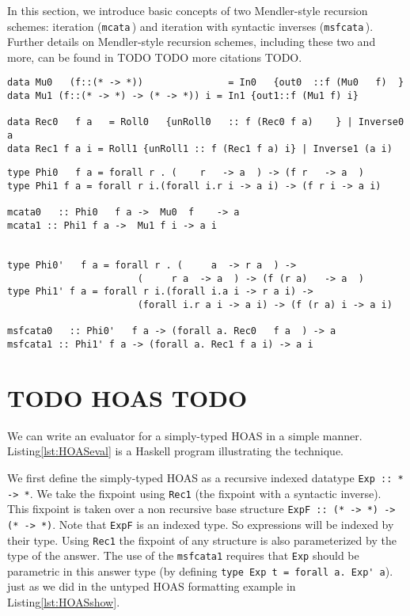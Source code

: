\documentclass[a4paper,UKenglish]{lipics}
\begin{document}
In this section, we introduce basic concepts of two Mendler-style recursion
schemes: iteration (\lstinline{mcata}\,) and iteration with syntactic inverses
(\lstinline{msfcata}\,). Further details on Mendler-style recursion schemes,
including these two and more, can be found in \cite{AhnShe11} TODO TODO
more citations TODO.



\begin{lstlisting}[caption={TODO}]
data Mu0   (f::(* -> *))               = In0   {out0  ::f (Mu0   f)  }
data Mu1 (f::(* -> *) -> (* -> *)) i = In1 {out1::f (Mu1 f) i}
                                                              
data Rec0   f a   = Roll0   {unRoll0   :: f (Rec0 f a)    } | Inverse0   a
data Rec1 f a i = Roll1 {unRoll1 :: f (Rec1 f a) i} | Inverse1 (a i)
\end{lstlisting}

\begin{lstlisting}[caption={TODO \label{lst:reccomb}}]
type Phi0   f a = forall r . (    r   -> a  ) -> (f r   -> a  )
type Phi1 f a = forall r i.(forall i.r i -> a i) -> (f r i -> a i)

mcata0   :: Phi0   f a ->  Mu0  f    -> a
mcata1 :: Phi1 f a ->  Mu1 f i -> a i


type Phi0'   f a = forall r . (     a  -> r a  ) ->
                       (     r a  -> a  ) -> (f (r a)   -> a  )
type Phi1' f a = forall r i.(forall i.a i -> r a i) ->
                       (forall i.r a i -> a i) -> (f (r a) i -> a i)

msfcata0   :: Phi0'   f a -> (forall a. Rec0   f a  ) -> a
msfcata1 :: Phi1' f a -> (forall a. Rec1 f a i) -> a i
\end{lstlisting}

\begin{figure}

\vspace*{-3ex}
\end{figure}

\section{TODO HOAS TODO}\label{sec:HOASeval}
We can write an evaluator for a simply-typed HOAS
in a simple manner. Listing\;\ref{lst:HOASeval}
is a Haskell program illustrating the technique.

We first define the simply-typed HOAS as a recursive indexed datatype
\lstinline{Exp :: * -> *}. We take the fixpoint using \lstinline{Rec1}
(the fixpoint with a syntactic inverse). This fixpoint is taken over
a non recursive base structure \lstinline{ExpF :: (* -> *) -> (* -> *)}.
Note that \lstinline{ExpF} is an indexed type. So expressions will be indexed
by their type. Using \lstinline{Rec1} the fixpoint of any structure is also
parameterized by the type of the answer. The use of the \lstinline{msfcata1}
requires that \lstinline{Exp} should be parametric in this answer type
(by defining \lstinline{type Exp t = forall a. Exp' a}). just as we did
in the untyped HOAS formatting example in Listing\;\ref{lst:HOASshow}.
\end{document}
